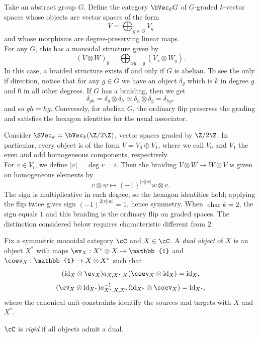 \begin{example}
    Take an abstract group $G$. Define the category $\bVec_k G$ of $G$-graded $k$-vector spaces whose objects are vector spaces of the form $$V = \bigoplus_{g \in G} V_g$$ and whose morphisms are degree-preserving linear maps.\\
    For any $G$, this has a monoidal structure given by
    \[(V \otimes W)_g = \bigoplus_{xy = g} (V_x \otimes W_y).\]
    In this case, a braided structure exists if and only if $G$ is abelian. To see the only if direction, notice that for any $g \in G$ we have an object $\delta_g$ which is $k$ in degree $g$ and $0$ in all other degrees. If $G$ has a braiding, then we get
    \[\delta_{gh} = \delta_g \otimes \delta_h \simeq \delta_h \otimes \delta_g = \delta_{hg},\]
    and so $gh = hg$. Conversely, for abelian $G$, the ordinary flip preserves the grading and satisfies the hexagon identities for the usual associator.
\end{example}
\begin{example}
    Consider $\SVec_k = \bVec_k(\Z/2\Z)$, vector spaces graded by $\Z/2\Z$. In particular, every object is of the form $V = V_0 \oplus V_1$, where we call $V_0$ and $V_1$ the even and odd homogeneous components, respectively. \\
    For $v \in V_i$, we define $|v| = \deg v = i$. Then the braiding $V \otimes W \to W \otimes V$ is given on homogeneous elements by
    \[v \otimes w \mapsto (-1)^{|v||w|} w \otimes v.\]
    The sign is multiplicative in each degree, so the hexagon identities hold; applying the flip twice gives sign $(-1)^{2|v||w|}=1$, hence symmetry. When $\operatorname{char}k=2$, the sign equals $1$ and this braiding is the ordinary flip on graded spaces. The distinction considered below requires characteristic different from $2$.
\end{example}
\begin{definition}
    Fix a symmetric monoidal category $\cC$ and $X \in \cC$. A \textit{dual object} of $X$ is an object $X^*$ with maps $\ev_X: X^* \otimes X \to \mathbb{1}$ and $\coev_X: \mathbb{1} \to X \otimes X^*$ such that
    \[
    (\mathrm{id}_X\otimes\ev_X)a_{X,X^*,X}
    (\coev_X\otimes\mathrm{id}_X)=\mathrm{id}_X,
    \]
    \[
    (\ev_X\otimes\mathrm{id}_{X^*})a^{-1}_{X^*,X,X^*}
    (\mathrm{id}_{X^*}\otimes\coev_X)=\mathrm{id}_{X^*},
    \]
    where the canonical unit constraints identify the sources and targets with $X$ and $X^*$.
\end{definition}
\begin{definition}
    $\cC$ is \textit{rigid} if all objects admit a dual.
\end{definition}
